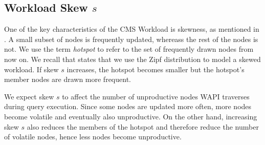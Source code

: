 \documentclass[abstracton,12pt]{scrartcl}
\theoremstyle{definition}
\begin{document}
\lipsum[5-9]

\subsection{Workload Skew $s$}

\label{sec:skew}

One of the key characteristics of the CMS Workload is skewness, as mentioned in 
. A small subset of nodes is frequently updated,
whereass the rest of the nodes is not. We use the term \textit{hotspot} to refer
to the set of frequently drawn nodes from now on.
We recall that  states that we use the Zipf distribution
to model a skewed workload. If skew $s$ increases, the hotspot becomes smaller 
but the hotspot's member nodes are drawn more frequent.

We expect skew $s$ to affect the number of unproductive nodes WAPI traverses during
query execution. Since some nodes are updated more often, more nodes become volatile
and eventually also unproductive. On the other hand, increasing skew $s$ also reduces
the members of the hotspot and therefore reduce
the number of volatile nodes, hence less nodes become unproductive.
\end{document}
